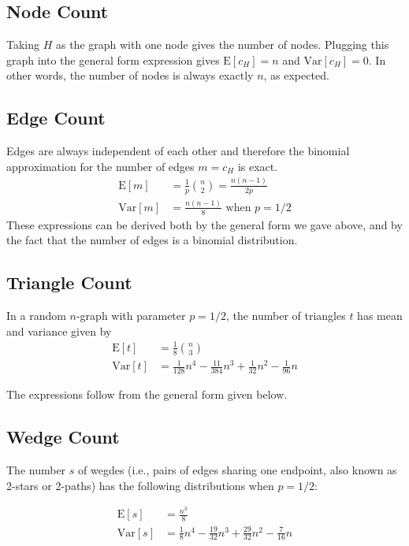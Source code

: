 \documentclass{article}
\begin{document}
\subsection{Node Count}
Taking $H$ as the graph with one node gives the number of
nodes. Plugging this graph into the general form expression gives
$\mathrm{E}[c_H]=n$ and $\mathrm{Var}[c_H] = 0$.  In other words, the
number of nodes is always exactly $n$, as expected. 

\subsection{Edge Count}
Edges are always independent of each other and therefore the binomial
approximation for the number of edges $m = c_H$ is exact.
\begin{align*}
  \mathrm{E}[m] &= \frac 1p {n \choose 2} = \frac{n(n-1)}{2p} \\
  \mathrm{Var}[m] &= \frac{n(n-1)}{8} \text{ when $p=1/2$}
\end{align*}
These expressions can be derived both by the general form we gave above,
and by the fact that the number of edges is a binomial distribution. 

\subsection{Triangle Count}
In a random $n$-graph with parameter $p=1/2$, the number of triangles $t$
has mean and variance given by
\begin{align*}
  \mathrm{E}[t] &= \frac 18 {n \choose 3} \\
  \mathrm{Var}[t] &=
  \frac 1 {128} n^4 - \frac{11}{384}n^3 + \frac 1 {32} n^2 - \frac 1{96} n
\end{align*}

The expressions follow from the general form given below. 

\subsection{Wedge Count}
The number $s$ of wegdes (i.e., pairs of edges sharing one endpoint,
also known as 2-stars or 2-paths) has
the following distributions when $p=1/2$:

\begin{align*}
  \mathrm{E}[s] &= \frac{n^{\underline{3}}}{8} \\
  \mathrm{Var}[s] &= \frac 18 n^4 - \frac{19}{32}n^3 + \frac {29}{32}n^2
  - \frac{7}{16}n
\end{align*}
\end{document}
